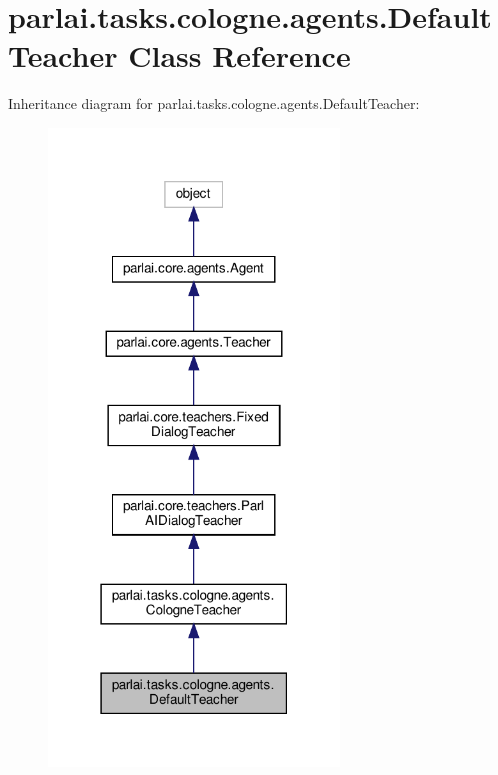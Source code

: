 \hypertarget{classparlai_1_1tasks_1_1cologne_1_1agents_1_1DefaultTeacher}{}\section{parlai.\+tasks.\+cologne.\+agents.\+Default\+Teacher Class Reference}
\label{classparlai_1_1tasks_1_1cologne_1_1agents_1_1DefaultTeacher}


Inheritance diagram for parlai.\+tasks.\+cologne.\+agents.\+Default\+Teacher\+:
\nopagebreak
\begin{figure}[H]
\begin{center}
\leavevmode
\includegraphics[width=219pt]{da/d51/classparlai_1_1tasks_1_1cologne_1_1agents_1_1DefaultTeacher__inherit__graph}
\end{center}
\end{figure}


